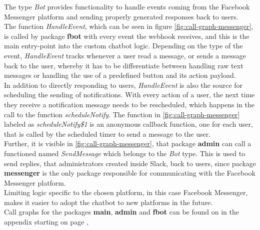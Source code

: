 The type \emph{Bot} provides functionality to handle events coming from the Facebook Messenger platform
and sending properly generated responses back to users.
\\
The function \emph{HandleEvent}, which can be seen in figure \ref{fig:call-graph-messenger},
is called by package \textbf{fbot} with every event the webhook receives,
and this is the main entry-point into the custom chatbot logic.
Depending on the type of the event,
\emph{HandleEvent} tracks whenever a user read a message,
or sends a message back to the user,
whereby it has to be differentiate between handling raw text messages
or handling the use of a predefined button and its action payload.
\\

In addition to directly responding to users,
\emph{HandleEvent} is also the source for scheduling the sending of notifications.
With every action of a user, the next time they receive a notification message needs to be rescheduled,
which happens in the call to the function \emph{scheduleNotify}.
The function in \ref{fig:call-graph-messenger} labeled as \emph{scheduleNotify\$1} is an anonymous callback function,
one for each user, that is called by the scheduled timer to send a message to the user.
\\

Further, it is visible in \ref{fig:call-graph-messenger},
that package \textbf{admin} can call a functioned named \emph{SendMessage} which belongs to the \emph{Bot} type.
This is used to send replies, that administrators created inside Slack, back to users,
since package \textbf{messenger} is the only package responsible for communicating with the Facebook Messenger platform.
\\

Limiting logic specific to the chosen platform, in this case Facebook Messenger,
makes it easier to adopt the chatbot to new platforms in the future.
\\

Call graphs for the packages \textbf{main}, \textbf{admin} and \textbf{fbot} can be found on in the appendix starting on page \pageref{a:call-graph},
